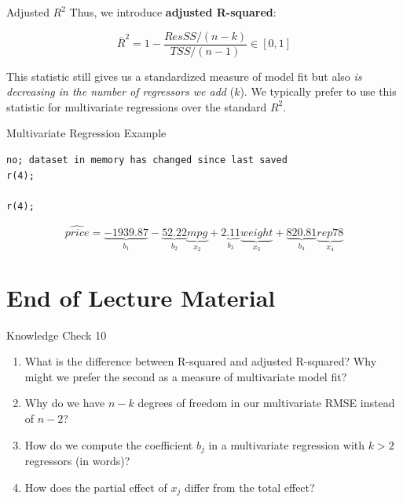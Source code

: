 \documentclass[
  ignorenonframetext,
  english,
]{beamer}
\begin{document}
\begin{frame}{Adjusted \(R^2\)}
\protect{}\label{adjusted-r2}
Thus, we introduce \textbf{adjusted R-squared}:

\[\bar{R}^2=1-\frac{ResSS/(n-k)}{TSS/(n-1)}\in[0,1]\]

This statistic still gives us a standardized measure of model fit but
also \emph{is decreasing in the number of regressors we add} (\(k\)). We
typically prefer to use this statistic for multivariate regressions over
the standard \(R^2\).
\end{frame}

\begin{frame}[fragile,shrink=30]{Multivariate Regression Example}
\protect{}\label{multivariate-regression-example}
\vspace{3em}

\begin{verbatim}
no; dataset in memory has changed since last saved
r(4);

r(4);
\end{verbatim}

\[\widehat{price}=\underbrace{-1939.87}_{b_1}-\underbrace{52.22}_{b_2}\underbrace{mpg}_{x_2}+\underbrace{2.11}_{b_3}\underbrace{weight}_{x_3}+\underbrace{820.81}_{b_4}\underbrace{rep78}_{x_4}\]
\end{frame}

\section{End of Lecture Material}\label{end-of-lecture-material}

\begin{frame}{Knowledge Check 10}
\protect{}\label{knowledge-check-10}
\begin{enumerate}
[1)]
\item
  What is the difference between R-squared and adjusted R-squared? Why
  might we prefer the second as a measure of multivariate model fit?
\item
  Why do we have \(n-k\) degrees of freedom in our multivariate RMSE
  instead of \(n-2\)?
\item
  How do we compute the coefficient \(b_j\) in a multivariate regression
  with \(k>2\) regressors (in words)?
\item
  How does the partial effect of \(x_j\) differ from the total effect?
\end{enumerate}
\end{frame}
\end{document}
